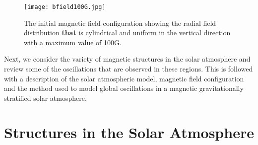 \documentclass[physics,article,submit,pdftex,moreauthors]{Definitions/mdpi}
\begin{document}
\begin{figure}[h]\label{inimagfieldplot}
\centering
\texttt{[image: bfield100G.jpg]}
\caption{The initial magnetic field configuration showing the radial field distribution {\bf that} is cylindrical and uniform in the vertical direction with a maximum value of 100G.}
\end{figure}

\break




Next, we consider the variety of magnetic structures in the solar atmosphere and review some of the oscillations that are observed in these regions. This is followed with a description of the solar atmospheric model, magnetic field configuration and the method used to  model global oscillations in a magnetic gravitationally stratified solar atmosphere.
\section{Structures in the Solar Atmosphere}

\label{sec:structures}
\end{document}
